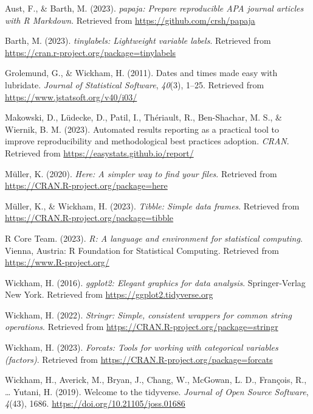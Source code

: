 \documentclass[
  man]{apa6}
\newlength{\cslhangindent}
\newenvironment{CSLReferences}[2] %
 {\begin{list}{}{%
  \setlength{\itemindent}{0pt}
  \setlength{\leftmargin}{0pt}
  \setlength{\parsep}{0pt}
  \ifodd #1
   \setlength{\leftmargin}{\cslhangindent}
   \setlength{\itemindent}{-1\cslhangindent}
  \fi
  \setlength{\itemsep}{#2\baselineskip}}}
 {\end{list}}
\begin{document}
\label{refs}
\begin{CSLReferences}{1}{0}
Aust, F., \& Barth, M. (2023). \emph{{papaja}: {Prepare} reproducible {APA} journal articles with {R Markdown}}. Retrieved from \url{https://github.com/crsh/papaja}

Barth, M. (2023). \emph{{tinylabels}: Lightweight variable labels}. Retrieved from \url{https://cran.r-project.org/package=tinylabels}

Grolemund, G., \& Wickham, H. (2011). Dates and times made easy with {lubridate}. \emph{Journal of Statistical Software}, \emph{40}(3), 1--25. Retrieved from \url{https://www.jstatsoft.org/v40/i03/}

Makowski, D., Lüdecke, D., Patil, I., Thériault, R., Ben-Shachar, M. S., \& Wiernik, B. M. (2023). Automated results reporting as a practical tool to improve reproducibility and methodological best practices adoption. \emph{CRAN}. Retrieved from \url{https://easystats.github.io/report/}

Müller, K. (2020). \emph{Here: A simpler way to find your files}. Retrieved from \url{https://CRAN.R-project.org/package=here}

Müller, K., \& Wickham, H. (2023). \emph{Tibble: Simple data frames}. Retrieved from \url{https://CRAN.R-project.org/package=tibble}

R Core Team. (2023). \emph{R: A language and environment for statistical computing}. Vienna, Austria: R Foundation for Statistical Computing. Retrieved from \url{https://www.R-project.org/}

Wickham, H. (2016). \emph{ggplot2: Elegant graphics for data analysis}. Springer-Verlag New York. Retrieved from \url{https://ggplot2.tidyverse.org}

Wickham, H. (2022). \emph{Stringr: Simple, consistent wrappers for common string operations}. Retrieved from \url{https://CRAN.R-project.org/package=stringr}

Wickham, H. (2023). \emph{Forcats: Tools for working with categorical variables (factors)}. Retrieved from \url{https://CRAN.R-project.org/package=forcats}

Wickham, H., Averick, M., Bryan, J., Chang, W., McGowan, L. D., François, R., \ldots{} Yutani, H. (2019). Welcome to the {tidyverse}. \emph{Journal of Open Source Software}, \emph{4}(43), 1686. \url{https://doi.org/10.21105/joss.01686}


\end{CSLReferences}
\end{document}
